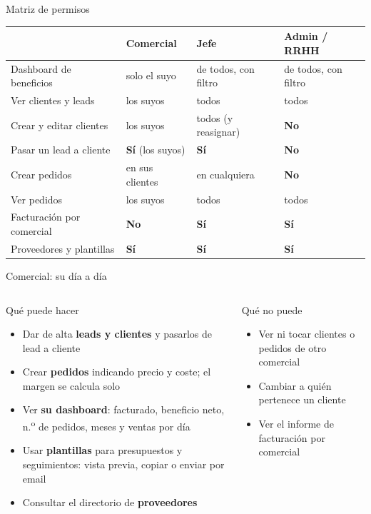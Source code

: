 \documentclass[aspectratio=169,11pt]{beamer}
\newcommand{\si}[1][]{\textcolor{ok}{\textbf{S\'i}}#1}
\newcommand{\no}{\textcolor{no}{\textbf{No}}}
\begin{document}
\begin{frame}{Matriz de permisos}
  \centering\small
  \renewcommand{\arraystretch}{1.3}\setlength{\tabcolsep}{4pt}
  \begin{tabular}{@{}L{4.1cm}L{2.5cm}L{3.2cm}L{3.2cm}@{}}
    \toprule
    & \textbf{Comercial} & \textbf{Jefe} & \textbf{Admin / RRHH}\\
    \midrule
    Dashboard de beneficios        & solo el suyo & de todos, con filtro & de todos, con filtro\\
    Ver clientes y leads           & los suyos & todos & todos\\
    Crear y editar clientes        & los suyos & todos (y reasignar) & \no\\
    Pasar un lead a cliente        & \si[ (los suyos)] & \si & \no\\
    Crear pedidos                  & en sus clientes & en cualquiera & \no\\
    Ver pedidos                    & los suyos & todos & todos\\
    Facturaci\'on por comercial     & \no & \si & \si\\
    Proveedores y plantillas       & \si & \si & \si\\
    \bottomrule
  \end{tabular}
\end{frame}

\begin{frame}{Comercial: su d\'ia a d\'ia}
  \begin{columns}[T]
    \begin{block}{Qu\'e puede hacer}
      \begin{itemize}
        \item Dar de alta \textbf{leads y clientes} y pasarlos de lead a cliente
        \item Crear \textbf{pedidos} indicando precio y coste; el margen se calcula solo
        \item Ver \textbf{su dashboard}: facturado, beneficio neto, n.\textsuperscript{o} de pedidos, meses y ventas por d\'ia
        \item Usar \textbf{plantillas} para presupuestos y seguimientos: vista previa, copiar o enviar por email
        \item Consultar el directorio de \textbf{proveedores}
      \end{itemize}
    \end{block}
    \begin{alertblock}{Qu\'e no puede}
      \begin{itemize}
        \item Ver ni tocar clientes o pedidos de otro comercial
        \item Cambiar a qui\'en pertenece un cliente
        \item Ver el informe de facturaci\'on por comercial
      \end{itemize}
    \end{alertblock}
  \end{columns}
\end{frame}
\end{document}
